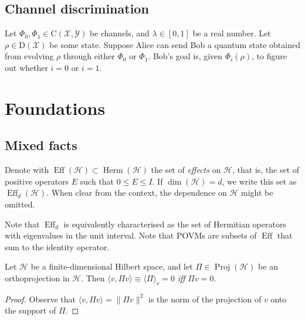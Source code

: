 \documentclass[12pt]{report}
\newcommand{\on}[1]{\operatorname{#1}}
\newcommand{\calH}{{\mathcal{H}}}
\newcommand{\calY}{{\mathcal{Y}}}
\newcommand{\calX}{{\mathcal{X}}}
\newcommand{\rmC}{{\mathrm{C}}}
\newcommand{\rmD}{{\mathrm{D}}}
\DeclareMathOperator{\Herm}{Herm}
\DeclareMathOperator{\Proj}{Proj}
\begin{document}
\section{Channel discrimination}

Let $\Phi_0,\Phi_1\in\rmC(\calX,\calY)$ be channels, and $\lambda\in[0,1]$ be a real number. Let $\rho\in\rmD(\calX)$ be some state.
Suppose Alice can send Bob a quantum state obtained from evolving $\rho$ through either $\Phi_0$ or $\Phi_1$.
Bob's goal is, given $\Phi_i(\rho)$, to figure out whether $i=0$ or $i=1$.



\chapter{Foundations}

\section{Mixed facts}

\begin{defn}[Effects]
	Denote with $\on{Eff}(\calH)\subset\Herm(\calH)$ the set of \emph{effects} on $\calH$, that is, the set of positive operators $E$ such that $0\le E \le I$. If $\dim(\calH)=d$, we write this set as $\on{Eff}_d(\calH)$. When clear from the context, the dependence on $\calH$ might be omitted.
\end{defn}
Note that $\on{Eff}_d$ is equivalently characterised as the set of Hermitian operators with eigenvalues in the unit interval.
Note that POVMs are subsets of $\on{Eff}$ that sum to the identity operator.

\begin{prop}\label{prop:expval_of_projections_same_as_orthogonal_vec}
	Let $\calH$ be a finite-dimensional Hilbert space, and let $\Pi\in\Proj(\calH)$ be an orthoprojection in $\calH$.
	Then $\langle v,\Pi v\rangle\equiv\langle \Pi\rangle_v=0$ \emph{iff} $\Pi v=0$.
\end{prop}
\begin{proof}
	Observe that $\langle v,\Pi v\rangle=\|\Pi v\|^2$ is the norm of the projection of $v$ onto the support of $\Pi$.
\end{proof}
\end{document}
